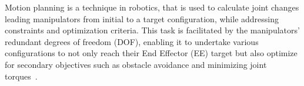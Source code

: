 \documentclass[letterpaper, 10 pt, conference]{ieeeconf}  %
\begin{document}
%
%
%

Motion planning is a technique in robotics, that is used to calculate joint changes leading manipulators from initial to a target configuration, while addressing constraints and optimization criteria. This task is facilitated by the manipulators' redundant degrees of freedom (DOF), enabling it to undertake various configurations to not only reach their End Effector (EE) target but also optimize for secondary objectives such as obstacle avoidance and minimizing joint torques~\cite{siciliano1990kinematic, siciliano2010robot}.
\end{document}
